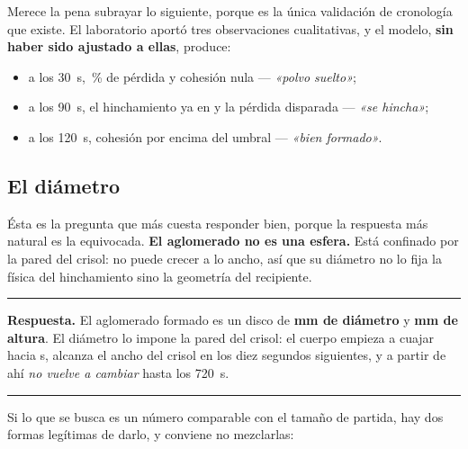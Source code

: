 \documentclass[11pt,a4paper]{article}
\newenvironment{clave}
  {\par\medskip\noindent\rule{\linewidth}{0.9pt}\par\nobreak\smallskip
   \noindent\ignorespaces}
  {\par\smallskip\noindent\rule{\linewidth}{0.9pt}\par\medskip}
\begin{document}
\noindent
Merece la pena subrayar lo siguiente, porque es la única validación de
cronología que existe. El laboratorio aportó tres observaciones cualitativas, y
el modelo, \textbf{sin haber sido ajustado a ellas}, produce:

\begin{itemize}[nosep,leftmargin=*]
  \item a los \SI{30}{\second}, \datPerdidaTreinta{}\,\% de pérdida
        y cohesión nula
        \;---\; \emph{«polvo suelto»};
  \item a los \SI{90}{\second}, el hinchamiento ya en \datHinchamientoNoventa{}
        y la pérdida
        disparada \;---\; \emph{«se hincha»};
  \item a los \SI{120}{\second}, cohesión por encima del umbral
        \;---\; \emph{«bien formado»}.
\end{itemize}

\subsection{El diámetro}

Ésta es la pregunta que más cuesta responder bien, porque la respuesta
más natural es la equivocada. \textbf{El aglomerado no es una esfera.} Está
confinado por la pared del crisol: no puede crecer a lo ancho, así que su
diámetro no lo fija la física del hinchamiento sino la geometría del recipiente.

\begin{table}[H]\centering\small
\caption{Dimensiones del cuerpo formado, al final de la corrida.}

\end{table}

\begin{clave}
\textbf{Respuesta.} El aglomerado formado es un disco de
\textbf{\datDiametro{} \si{\milli\meter} de diámetro} y
\textbf{\datAltura{} \si{\milli\meter} de altura}. El diámetro lo impone la
pared del crisol: el cuerpo empieza a cuajar hacia \datTFormacion{}
\si{\second}, alcanza el ancho del crisol en los diez segundos siguientes, y a
partir de ahí \emph{no vuelve a cambiar} hasta los \SI{720}{\second}.
\end{clave}

\noindent
Si lo que se busca es un número comparable con el tamaño de partida, hay dos
formas legítimas de darlo, y conviene no mezclarlas:
\end{document}
